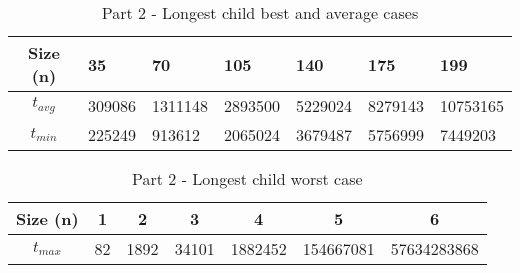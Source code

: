 \usepackage{array}

\begin{table}[h!]
\begin{center}
\begin{tabular}{|c|m{1cm}|m{1cm}|m{1cm}|m{1cm}|m{1cm}|m{1.2cm}|} 
 \hline
 Size (n) & 35 & 70 & 105 & 140 & 175 & 199 \\
 \hline\hline
 $t_{avg}$ & 309086 & 1311148 & 2893500 & 5229024 & 8279143 & 10753165 \\
 \hline
 $t_{min}$ & 225249 & 913612 & 2065024 & 3679487 & 5756999 & 7449203 \\
 \hline
\end{tabular}
\label{path_table}
\caption{Part 2 - Longest child best and average cases}
\end{center}
\end{table}

\begin{table}[h!]
\begin{center}
\begin{tabular}{|c|c|c|c|c|c|c|}
 \hline
 Size (n) & 1 & 2 & 3 & 4 & 5 & 6 \\
 \hline\hline
 $t_{max}$ & 82 & 1892 & 34101 & 1882452 & 154667081 & 57634283868 \\
 \hline
\end{tabular}
\label{path_table_worst}
\caption{Part 2 - Longest child worst case}
\end{center}
\end{table}
